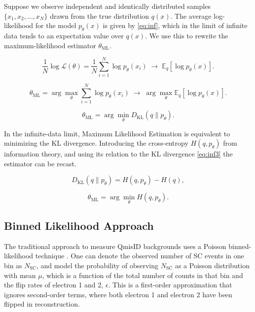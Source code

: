 Suppose we observe independent and identically distributed samples
\(\{x_1, x_2, \dots, x_N\}\) drawn from the true distribution \(q(x)\).
The average log-likelihood for the model \(p_\theta(x)\) is given by \eqref{eq:inf}, which in the limit of infinite data tends to an expectation value over \(q(x)\). We use this to rewrite the maximum-likelihood estimator \(\theta_{\mathrm{ML}}\).

\begin{equation}
\frac{1}{N}\log \mathcal{L}(\theta)
=
\frac{1}{N}
\sum_{i=1}^{N}
\log p_{\theta}(x_i)
\;\longrightarrow\;
\mathbb{E}_{q}[\log p_{\theta}(x)] .
\label{eq:inf}
\end{equation}

\begin{equation}
\theta_{\mathrm{ML}}
=
\arg\max_{\theta}
\sum_{i=1}^{N}
\log p_{\theta}(x_i)
\;\longrightarrow\;
\arg\max_{\theta}
\mathbb{E}_{q}[\log p_{\theta}(x)] .
\label{eq:inf2}
\end{equation}

\begin{equation}
\theta_{\mathrm{ML}}
=
\arg\min_{\theta}
D_{\mathrm{KL}}(q \parallel p_{\theta}) .
\end{equation}

In the infinite-data limit, Maximum Likelihood Estimation is equivalent to minimizing the KL divergence. Introducing the cross-entropy \(H(q,p_\theta)\) from information theory, and using its relation to the KL divergence \eqref{eq:inf3} the estimator can be recast.

\begin{equation}
D_{\mathrm{KL}}(q \parallel p_\theta)
=
H(q,p_\theta) - H(q),
\label{eq:inf3}
\end{equation}

\begin{equation}
\theta_{\mathrm{ML}}
=
\arg\min_{\theta}
H(q,p_\theta).
\end{equation}


\subsection{Binned Likelihood Approach}

The traditional approach to measure QmisID backgrounds uses a Poisson binned-likelihood technique \cite{huang2025qmisid}. One can denote the observed number of SC events in one bin as \(N_{\mathrm{SC}}\), and model the probability of observing \(N_{\mathrm{SC}}\) as a Poisson distribution with mean \(\mu\), which is a function of the total number of counts in that bin and the flip rates of electron 1 and 2, \(\epsilon\). This is a first-order approximation that ignores second-order terms, where both electron 1 and electron 2 have been flipped in reconstruction.

